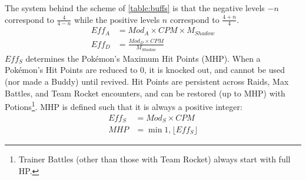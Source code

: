 The system behind the scheme of \autoref{table:buffs} is that the negative levels $-n$
 correspond to $\frac{4}{4 - n}$ while the positive levels $n$ correspond to
 $\frac{4 + n}{4}$.
\begin{align*}
 Eff_A &= Mod_A \times CPM \times M_{Shadow} \\
 Eff_D &= \frac{Mod_D \times CPM}{M_{Shadow}}
\end{align*}
$Eff_S$ determines the Pokémon's Maximum Hit Points (MHP).
When a Pokémon's Hit Points are reduced to 0, it is knocked out, and cannot be
 used (nor made a Buddy) until revived.
Hit Points are persistent across Raids, Max Battles, and Team Rocket encounters,
 and can be restored (up to MHP) with Potions\footnote{Trainer Battles (other
 than those with Team Rocket) always start with full HP.}.
MHP is defined such that it is always a positive integer:
\begin{align*}
 Eff_S &= Mod_S \times CPM \\
 MHP &= \min{1, \lfloor Eff_S \rfloor}
\end{align*}
